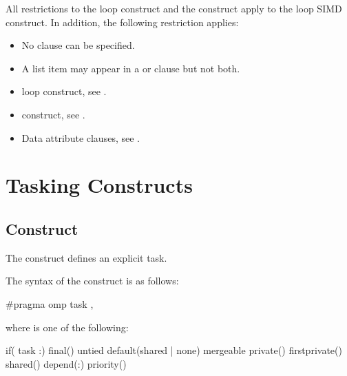 \restrictions
All restrictions to the loop construct and the  construct apply to the loop SIMD 
construct. In addition, the following restriction applies:

\begin{itemize}
\item No  clause can be specified.
\item A list item may appear in a  or  clause but not both.
\end{itemize}

\begin{samepage}
\crossreferences
\begin{itemize}
\item loop construct, see 
.

\item {} construct, see 
.

\item Data attribute clauses, see 
. 
\end{itemize}
\end{samepage}




\section{Tasking Constructs}
\label{sec:Tasking Constructs}
\subsection{ Construct}
\label{subsec:task Construct}
\summary
The  construct defines an explicit task.

\syntax
\ccppspecificstart
The syntax of the  construct is as follows: 

\begin{boxedcode}
\#pragma omp task \plc{[clause[ [},\plc{] clause] ... ] new-line}
\end{boxedcode}

\begin{samepage}
where  is one of the following: 

\begin{indentedcodelist}
if(\plc{[} task :\plc{] scalar-expression})
final()
untied
default(shared \textnormal{|} none)
mergeable
private()
firstprivate()
shared()
depend(:)
priority()
\end{indentedcodelist}
\ccppspecificend
\end{samepage}

